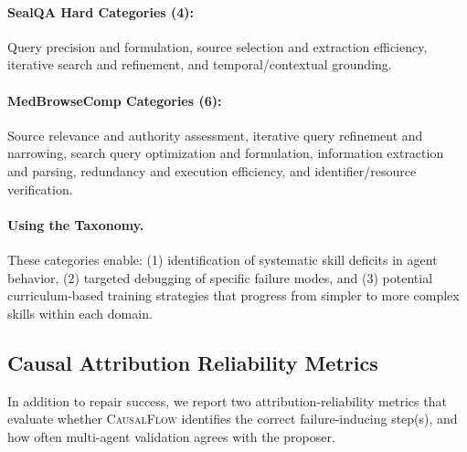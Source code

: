 \documentclass{article}
\theoremstyle{plain}
\theoremstyle{definition}
\theoremstyle{remark}
\begin{document}
\paragraph{SealQA Hard Categories (4):}
Query precision and formulation, source selection and extraction efficiency, iterative search and refinement, and temporal/contextual grounding.

\paragraph{MedBrowseComp Categories (6):}
Source relevance and authority assessment, iterative query refinement and narrowing, search query optimization and formulation, information extraction and parsing, redundancy and execution efficiency, and identifier/resource verification.

\paragraph{Using the Taxonomy.}
These categories enable: (1) identification of systematic skill deficits in agent behavior, (2) targeted debugging of specific failure modes, and (3) potential curriculum-based training strategies that progress from simpler to more complex skills within each domain.

\subsection{Causal Attribution Reliability Metrics}

In addition to repair success, we report two attribution-reliability metrics that evaluate whether \textsc{CausalFlow} identifies the correct failure-inducing step(s), and how often multi-agent validation agrees with the proposer.
\end{document}
